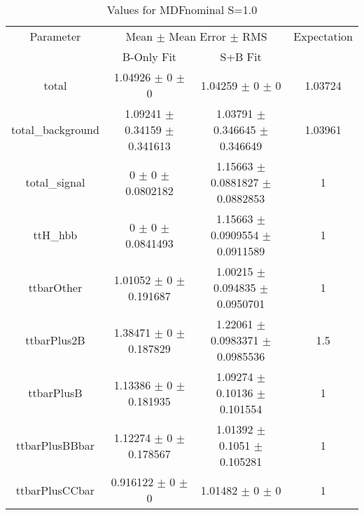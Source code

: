 \begin{table}
\centering
\caption{Values for MDFnominal S=1.0}
\begin{tabular}{cccc}
\toprule
Parameter & \multicolumn{2}{c}{Mean $\pm$ Mean Error $\pm$ RMS} & Expectation\\
 & B-Only Fit & S+B Fit & \\
\midrule
total & \num{1.04926} $\pm$ \num{0} $\pm$ \num{0} & \num{1.04259} $\pm$ \num{0} $\pm$ \num{0} & \num{1.03724}\\
total\_background & \num{1.09241} $\pm$ \num{0.34159} $\pm$ \num{0.341613} & \num{1.03791} $\pm$ \num{0.346645} $\pm$ \num{0.346649} & \num{1.03961}\\
total\_signal & \num{0} $\pm$ \num{0} $\pm$ \num{0.0802182} & \num{1.15663} $\pm$ \num{0.0881827} $\pm$ \num{0.0882853} & \num{1}\\
ttH\_hbb & \num{0} $\pm$ \num{0} $\pm$ \num{0.0841493} & \num{1.15663} $\pm$ \num{0.0909554} $\pm$ \num{0.0911589} & \num{1}\\
ttbarOther & \num{1.01052} $\pm$ \num{0} $\pm$ \num{0.191687} & \num{1.00215} $\pm$ \num{0.094835} $\pm$ \num{0.0950701} & \num{1}\\
ttbarPlus2B & \num{1.38471} $\pm$ \num{0} $\pm$ \num{0.187829} & \num{1.22061} $\pm$ \num{0.0983371} $\pm$ \num{0.0985536} & \num{1.5}\\
ttbarPlusB & \num{1.13386} $\pm$ \num{0} $\pm$ \num{0.181935} & \num{1.09274} $\pm$ \num{0.10136} $\pm$ \num{0.101554} & \num{1}\\
ttbarPlusBBbar & \num{1.12274} $\pm$ \num{0} $\pm$ \num{0.178567} & \num{1.01392} $\pm$ \num{0.1051} $\pm$ \num{0.105281} & \num{1}\\
ttbarPlusCCbar & \num{0.916122} $\pm$ \num{0} $\pm$ \num{0} & \num{1.01482} $\pm$ \num{0} $\pm$ \num{0} & \num{1}\\
\bottomrule
\end{tabular}
\end{table}